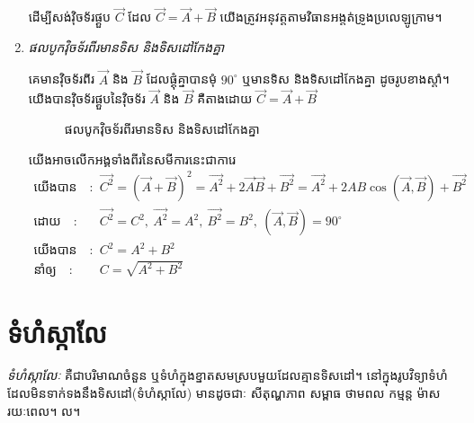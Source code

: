 \begin{enumerate}[m]
\begin{remark}
		ដើម្បីសង់វុិចទ័រផ្គួប $\overrightarrow{C}$ ដែល $\overrightarrow{C}=\overrightarrow{A}+\overrightarrow{B}$ យើងត្រូវអនុវត្តតាមវិធានអង្តត់ទ្រូងប្រលេឡូក្រាម។
	\end{remark}
	\item \emph{\kml ផលបូកវុិចទ័រពីរមានទិស និងទិសដៅកែងគ្នា}
	\begin{multicols}{2}
		\quad គេមានវុិចទ័រពីរ $\overrightarrow{A}$ និង $\overrightarrow{B}$ ដែលផ្គុំគ្នាបានមុំ $90^\circ$ ឬមានទិស និងទិសដៅកែងគ្នា ដូចរូបខាងស្តាំ។ យើងបានវុិចទ័រផ្គួបនៃវុិចទ័រ $\overrightarrow{A}$ និង $\overrightarrow{B}$ គឺតាងដោយ $\overrightarrow{C}=\overrightarrow{A}+\overrightarrow{B}$
		\begin{figure}[H]
			\centering
			\caption{\DS ផលបូកវុិចទ័រពីរមានទិស និងទិសដៅកែងគ្នា}
		\end{figure}
	\end{multicols}
	យើងអាចលើកអង្គទាំងពីរនៃសមីការនេះជាការេ
	\begin{align*}
		\text{យើងបាន}\quad :&\quad \overrightarrow{C^{2}} =\left(\overrightarrow{A}+\overrightarrow{B}\right)^{2}=\overrightarrow{A^{2}} + 2\overrightarrow{A}\overrightarrow{B}+\overrightarrow{B^{2}}=\overrightarrow{A^{2}} + 2AB\cos\left(\overrightarrow{A},\overrightarrow{B}\right) +\overrightarrow{B^{2}}\\
		\text{ដោយ}\quad :&\quad \overrightarrow{C^{2}}=C^{2},~\overrightarrow{A^{2}}=A^{2},~\overrightarrow{B^{2}}=B^{2},~\left(\overrightarrow{A},\overrightarrow{B}\right)=90^\circ\\
		\text{យើងបាន}\quad :&\quad C^{2}=A^{2}+B^{2}\\
		\text{នាំឲ្យ}\quad :&\quad C=\sqrt{A^{2}+B^{2}}
	\end{align*}
\end{enumerate}
\section{ទំហំស្កាលែ}
\begin{definition}
	\emph{\kml ទំហំស្កាលែៈ} គឺជាបរិមាណចំនួន ឬទំហំក្នុងខ្នាតសមស្របមួយដែលគ្មានទិសដៅ។ នៅក្នុងរូបវិទ្យាទំហំដែលមិនទាក់ទងនឹងទិសដៅ(ទំហំស្កាលែ) មានដូចជាៈ សីតុណ្ហភាព សម្ពាធ ថាមពល កម្មន្ត ម៉ាស រយៈពេល។ ល។
\end{definition}
